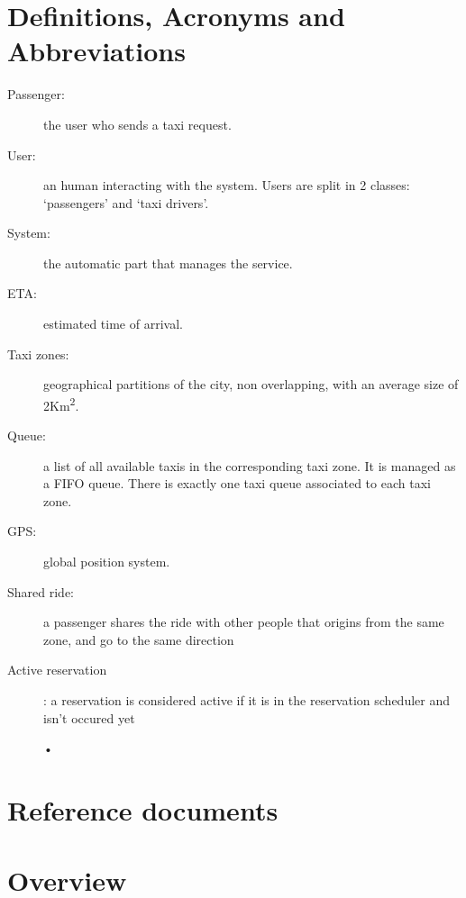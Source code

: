 \section{Definitions, Acronyms and Abbreviations}
\begin{description}
  \item[Passenger:] the user who sends a taxi request.
  \item[User:] an human interacting with the system. Users are split in 2 classes: `passengers' and `taxi drivers'.
  \item[System:] the automatic part that manages the service.
  \item[ETA:] estimated time of arrival.
  \item[Taxi zones:] geographical partitions of the city, non overlapping, with an average size of 2Km\textsuperscript{2}.
  \item[Queue:] a list of all available taxis in the corresponding taxi zone. It is managed as a FIFO queue.
    There is exactly one taxi queue associated to each taxi zone.
  \item[GPS:] global position system.
  \item[Shared ride:] a passenger shares the ride with other people that origins from the same zone, and go to the same direction
  \item[Active reservation]: a reservation is considered active if it is in the reservation scheduler and isn't occured yet
    \begin{center}
    •
    \end{center}
\end{description}


\section{Reference documents}


\section{Overview}

